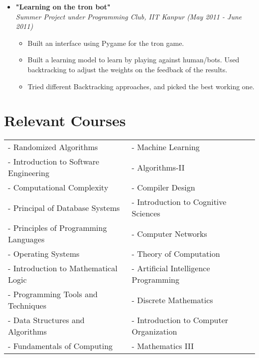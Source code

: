 \documentclass[margin,line]{resume}
\begin{document}
\begin{resume}
\begin{itemize}
    \item \large{\textbf{\textsf{"Learning on the tron bot"}}}
      \\ \small{\textit{Summer Project under Programming Club, IIT Kanpur (May 2011 - June 2011)}}
      \normalsize
      \begin{itemize}
      \item Built an interface using Pygame for the tron game.
      \item Built a learning model to learn by playing against human/bots. Used backtracking to adjust the weights on the feedback of the results.
      \item Tried different Backtracking approaches, and picked the best working one.
      \end{itemize}
      
    \end{itemize}




\section{\mysidestyle Relevant Courses} 

\begin{tabular}{@{}p{6cm}p{6.5cm}}
- Randomized Algorithms & - Machine Learning \\
- Introduction to Software Engineering & - Algorithms-II \\
- Computational Complexity &- Compiler Design \\
- Principal of Database Systems &- Introduction to Cognitive Sciences \\
- Principles of Programming Languages &- Computer Networks \\
- Operating Systems &- Theory of Computation \\
- Introduction to Mathematical Logic &- Artificial Intelligence Programming \\
- Programming Tools and Techniques &- Discrete Mathematics \\
- Data Structures and Algorithms & - Introduction to Computer Organization \\
- Fundamentals of Computing &- Mathematics III
\end{tabular}



\end{resume}
\end{document}
